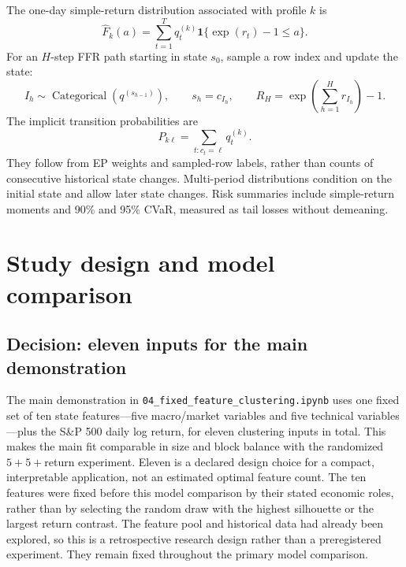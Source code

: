 \documentclass[11pt,a4paper]{article}
\begin{document}
The one-day simple-return distribution associated with profile \(k\) is
\begin{equation}
\widehat F_k(a)=
\sum_{t=1}^{T}q_t^{(k)}
\mathbf1\{\exp(r_t)-1\leq a\}.
\end{equation}
For an \(H\)-step FFR path starting in state \(s_0\), sample a row index and update the state:
\begin{equation}
I_h\sim\operatorname{Categorical}(q^{(s_{h-1})}),
\qquad s_h=c_{I_h},
\qquad
R_H=\exp\!\left(\sum_{h=1}^{H}r_{I_h}\right)-1.
\end{equation}
The implicit transition probabilities are
\begin{equation}
P_{k\ell}=\sum_{t:c_t=\ell}q_t^{(k)}.
\end{equation}
They follow from EP weights and sampled-row labels, rather than counts of consecutive historical state changes. Multi-period distributions condition on the initial state and allow later state changes. Risk summaries include simple-return moments and 90\% and 95\% CVaR, measured as tail losses without demeaning.

\section{Study design and model comparison}
\label{sec:study-design}

\subsection{Decision: eleven inputs for the main demonstration}

The main demonstration in \texttt{04\_fixed\_feature\_clustering.ipynb} uses one fixed set of ten state features---five macro/market variables and five technical variables---plus the S\&P 500 daily log return, for eleven clustering inputs in total. This makes the main fit comparable in size and block balance with the randomized $5+5+$return experiment. Eleven is a declared design choice for a compact, interpretable application, not an estimated optimal feature count. The ten features were fixed before this model comparison by their stated economic roles, rather than by selecting the random draw with the highest silhouette or the largest return contrast. The feature pool and historical data had already been explored, so this is a retrospective research design rather than a preregistered experiment. They remain fixed throughout the primary model comparison.
\end{document}
